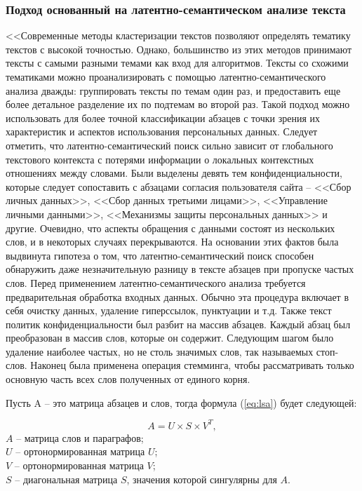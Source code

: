 \documentclass[../main]{subfiles}
\begin{document}
\subsubsection{Подход основанный на латентно-семантическом анализе текста}

<<Современные методы кластеризации текстов позволяют определять тематику текстов с высокой точностью. Однако, большинство из этих методов принимают тексты с самыми разными темами как вход для алгоритмов. Тексты со схожими тематиками можно проанализировать с помощью ла\-тен\-тно-семантического анализа дважды: группировать тексты по темам один раз, и предоставить еще более детальное разделение их по подтемам во второй раз. Такой подход можно использовать для более точной классификации абзацев с точки зрения их характеристик и аспектов использования персональных данных. Следует отметить, что латентно-семантический поиск сильно зависит от глобального текстового контекста с потерями информации о локальных контекстных отношениях между словами. Были выделены девять тем конфиденциальности, которые следует сопоставить с абзацами согласия пользователя сайта -- <<Сбор личных данных>>, <<Сбор данных третьими лицами>>, <<Управление личными данными>>, <<Механизмы защиты персональных данных>> и другие. Очевидно, что аспекты обращения с данными состоят из нескольких слов, и в некоторых случаях перекрываются. На основании этих фактов была выдвинута гипотеза о том, что латентно-семантический поиск способен обнаружить даже незначительную разницу в тексте абзацев при пропуске частых слов. Перед применением латентно-семантического анализа требуется предварительная обработка входных данных. Обычно эта процедура включает в себя очистку данных, удаление гиперссылок, пунктуации и т.д. Также текст политик конфиденциальности был разбит на массив абзацев. Каждый абзац был преобразован в массив слов, которые он содержит. Следующим шагом было удаление наиболее частых, но не столь значимых слов, так называемых стоп-слов. Наконец была применена операция стемминга, чтобы рассматривать только основную часть всех слов полученных от единого корня.

Пусть A -- это матрица абзацев и слов, тогда формула (\ref{eq:lsa}) будет следующей:

\newpage
\begin{equation}
    \label{eq:lsa}
    A = U \times S \times V^T,
\end{equation}
$A$ -- матрица слов и параграфов;\\
\makebox[1.25cm]{\hfill}$U$ -- ортонормированная матрица $U$;\\
\makebox[1.25cm]{\hfill}$V$ -- ортонормированная матрица $V$;\\
\makebox[1.25cm]{\hfill}$S$ -- диагональная матрица $S$, значения которой сингулярны для $A$.
\end{document}
